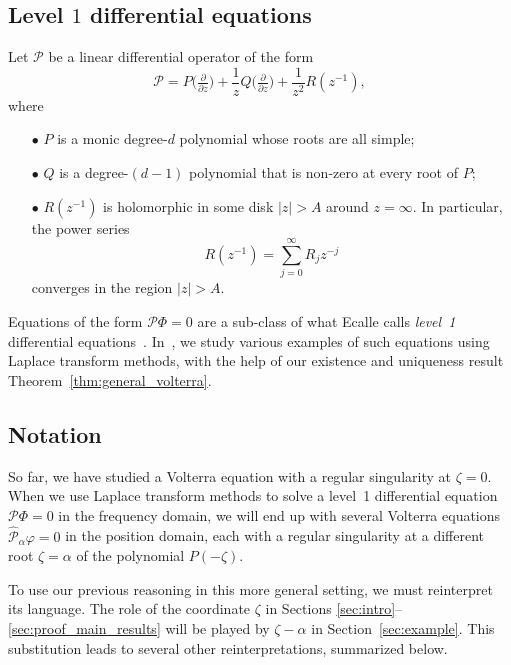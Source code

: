 \documentclass[final]{siamart220329}
\begin{document}
\subsection{Level $1$ differential equations}\label{sec:level 1 ODE}
Let $\mathcal{P}$ be a linear differential operator of the form
\[ \mathcal{P} = P\big(\tfrac{\partial}{\partial z}\big) + \frac{1}{z} Q\big(\tfrac{\partial}{\partial z}\big) + \frac{1}{z^2} R(z^{-1}), \]
where
\begin{enumerate}
\item[$\bullet$] $P$ is a monic degree-$d$ polynomial whose roots are all simple; 
\item[$\bullet$] $Q$ is a degree-$(d-1)$ polynomial that is non-zero at every root of $P$;
\item[$\bullet$] $R(z^{-1})$ is holomorphic in some disk $|z| > A$ around $z = \infty$. In particular, the power series
\[ R(z^{-1}) = \sum_{j=0}^\infty R_j z^{-j} \]
converges in the region $|z| > A$.
\end{enumerate}
Equations of the form $\mathcal{P}\Phi = 0$ are a sub-class of what Ecalle calls {\em level~1} differential equations~\cite[Section~2.1]{EcalleIII}\cite[Section~5.2.2.1]{diverg-resurg-iii}. In~\cite{borel_reg}, we study various examples of such equations using Laplace transform methods, with the help of our existence and uniqueness result Theorem~\ref{thm:general_volterra}. 
\subsection{Notation}\label{sec:notation_alpha}
So far, we have studied a Volterra equation with a regular singularity at $\zeta = 0$. When we use Laplace transform methods to solve a level~1 differential equation $\mathcal{P}\Phi = 0$ in the frequency domain, we will end up with several Volterra equations $\hat{\mathcal{P}}_\alpha \varphi = 0$ in the position domain, each with a regular singularity at a different root $\zeta = \alpha$ of the polynomial $P(-\zeta)$.

To use our previous reasoning in this more general setting, we must reinterpret its language. The role of the coordinate $\zeta$ in Sections \ref{sec:intro}--\ref{sec:proof_main_results} will be played by $\zeta-\alpha$ in Section~\ref{sec:example}. This substitution leads to several other reinterpretations, summarized below.
\end{document}

